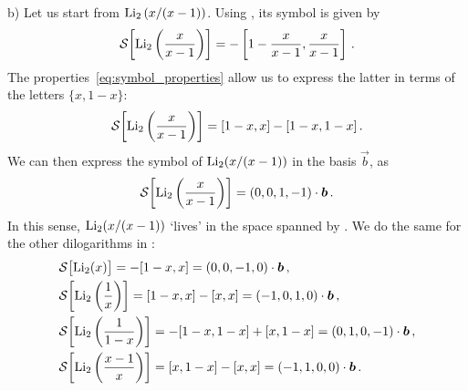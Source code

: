 \smallskip
\noindent
b) Let us start from ${\rm Li}_{2}\left(x/(x-1)\right)$. Using , its symbol is given by
\begin{align}
\mathcal{S}\biggl[{\rm Li}_{2}\left(\frac{x}{x-1}\right)\biggr] = - \left[1-\frac{x}{x-1}, \frac{x}{x-1} \right] \,.
\end{align}
The properties~\eqref{eq:symbol_properties} allow us to express the latter in terms of the letters $\{x,1-x\}$:
\begin{align}
\mathcal{S}\biggl[{\rm Li}_{2}\left(\frac{x}{x-1}\right)\biggr] = [1-x, x ] - [1-x, 1-x] \,.
\end{align}
We can then express the symbol of ${\rm Li}_{2}(x/(x-1))$ in the basis $\vec{b}$, as
\begin{align}
\mathcal{S}\biggl[{\rm Li}_{2}\left(\frac{x}{x-1}\right)\biggr] = (0, 0, 1, -1) \cdot \vec{b} \,.
\end{align}
In this sense, ${\rm Li}_{2}(x/(x-1))$ `lives' in the space spanned by . 
We do the same for the other dilogarithms in :
\begin{align}
& \mathcal{S}\bigl[ {\rm Li}_{2}(x) \bigr] = - [1-x,x] = (0, 0, -1, 0) \cdot \vec{b} \,, \\ 
& \mathcal{S}\biggl[ {\rm Li}_{2}\left(\frac{1}{x}\right)\biggr]  = [1 - x, x] - [x, x] = (-1, 0, 1, 0) \cdot \vec{b} \,, \\
& \mathcal{S}\biggl[  {\rm Li}_{2}\left(\frac{1}{1-x}\right)\biggr]  = -[1 - x, 1 - x] + [x, 1 - x] = (0, 1, 0, -1) \cdot \vec{b} \,, \\ 
& \mathcal{S}\biggl[  {\rm Li}_{2}\left(\frac{x-1}{x} \right)\biggr]  = [x, 1 - x] - [x, x] = (-1, 1, 0, 0) \cdot \vec{b} \,. 
\end{align}

